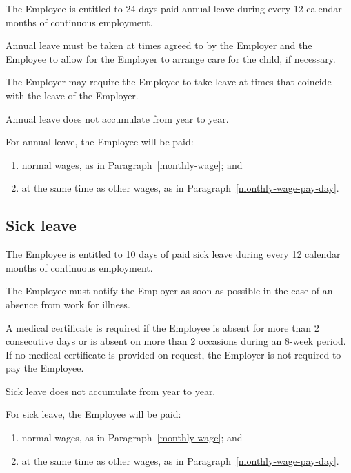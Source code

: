 \documentclass[a4paper,11pt]{article}
\begin{document}
\para The Employee is entitled to 24 days paid annual leave during every 12
calendar months of continuous employment.

\para Annual leave must be taken at times agreed to by the Employer and the
Employee to allow for the Employer to arrange care for the child, if necessary.

\para The Employer may require the Employee to take leave at times that
coincide with the leave of the Employer.

\para Annual leave does not accumulate from year to year.

\para For annual leave, the Employee will be paid:

\begin{enumerate}

  \item normal wages, as in Paragraph~\ref{monthly-wage}; and

  \item at the same time as other wages, as in
    Paragraph~\ref{monthly-wage-pay-day}.

\end{enumerate}

\subsection{Sick leave}
\label{sick-leave}

\para The Employee is entitled to 10 days of paid sick leave during every 12
calendar months of continuous employment.

\para The Employee must notify the Employer as soon as possible in the case of
an absence from work for illness.

\para A medical certificate is required if the Employee is absent for more than
2 consecutive days or is absent on more than 2 occasions during an 8-week
period. If no medical certificate is provided on request, the Employer is not
required to pay the Employee.

\para Sick leave does not accumulate from year to year.

\para For sick leave, the Employee will be paid:

\begin{enumerate}

  \item normal wages, as in Paragraph~\ref{monthly-wage}; and

  \item at the same time as other wages, as in
    Paragraph~\ref{monthly-wage-pay-day}.

\end{enumerate}
\end{document}
